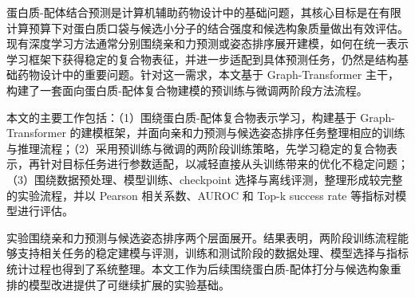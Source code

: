 
{}

\begin{abstractcn}
蛋白质-配体结合预测是计算机辅助药物设计中的基础问题，其核心目标是在有限计算预算下对蛋白质口袋与候选小分子的结合强度和候选构象质量做出有效评估。现有深度学习方法通常分别围绕亲和力预测或姿态排序展开建模，如何在统一表示学习框架下获得稳定的复合物表征，并进一步适配到具体预测任务，仍然是结构基础药物设计中的重要问题。针对这一需求，本文基于 Graph-Transformer 主干，构建了一套面向蛋白质-配体复合物建模的预训练与微调两阶段方法流程。

本文的主要工作包括：（1）围绕蛋白质-配体复合物表示学习，构建基于 Graph-Transformer 的建模框架，并面向亲和力预测与候选姿态排序任务整理相应的训练与推理流程；（2）采用预训练与微调的两阶段训练策略，先学习稳定的复合物表示，再针对目标任务进行参数适配，以减轻直接从头训练带来的优化不稳定问题；（3）围绕数据预处理、模型训练、checkpoint 选择与离线评测，整理形成较完整的实验流程，并以 Pearson 相关系数、AUROC 和 Top-k success rate 等指标对模型进行评估。

实验围绕亲和力预测与候选姿态排序两个层面展开。结果表明，两阶段训练流程能够支持相关任务的稳定建模与评测，训练和测试阶段的数据处理、模型选择与指标统计过程也得到了系统整理。本文工作为后续围绕蛋白质-配体打分与候选构象重排的模型改进提供了可继续扩展的实验基础。

\end{abstractcn}
